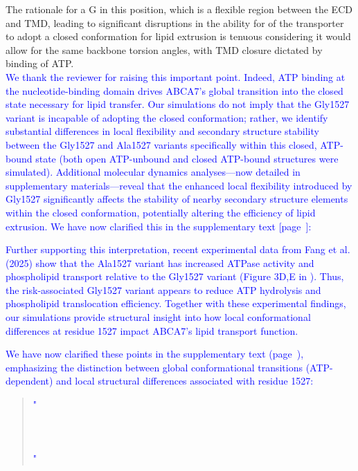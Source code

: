 The rationale for a G in this position, which is a flexible region between the ECD and TMD, leading to significant disruptions in the ability for of the transporter to adopt a closed conformation for lipid extrusion is tenuous considering it would allow for the same backbone torsion angles, with TMD closure dictated by binding of ATP.\\
\textcolor{blue}{We thank the reviewer for raising this important point. Indeed, ATP binding at the nucleotide-binding domain drives ABCA7’s global transition into the closed state necessary for lipid transfer. Our simulations do not imply that the Gly1527 variant is incapable of adopting the closed conformation; rather, we identify substantial differences in local flexibility and secondary structure stability between the Gly1527 and Ala1527 variants specifically within this closed, ATP-bound state (both open ATP-unbound and closed ATP-bound structures were simulated). Additional molecular dynamics analyses—now detailed in supplementary materials—reveal that the enhanced local flexibility introduced by Gly1527 significantly affects the stability of nearby secondary structure elements within the closed conformation, potentially altering the efficiency of lipid extrusion. We have now clarified this in the supplementary text [page~\pageref{quoteM-label}]:}

\textcolor{blue}{Further supporting this interpretation, recent experimental data from Fang et al. (2025) \cite{Fang2025} show that the Ala1527 variant has increased ATPase activity and phospholipid transport relative to the Gly1527 variant (Figure 3D,E in \cite{Fang2025}). Thus, the risk-associated Gly1527 variant appears to reduce ATP hydrolysis and phospholipid translocation efficiency. Together with these experimental findings, our simulations provide structural insight into how local conformational differences at residue 1527 impact ABCA7’s lipid transport function.}

\textcolor{blue}{We have now clarified these points in the supplementary text (page~\pageref{quoteM-label}), emphasizing the distinction between global conformational transitions (ATP-dependent) and local structural differences associated with residue 1527:}
\begin{quote}
	\textcolor{blue}{"}\quoteM\\\\
    \quoteN\\\\
    \quoteO\textcolor{blue}{"}
\end{quote}


